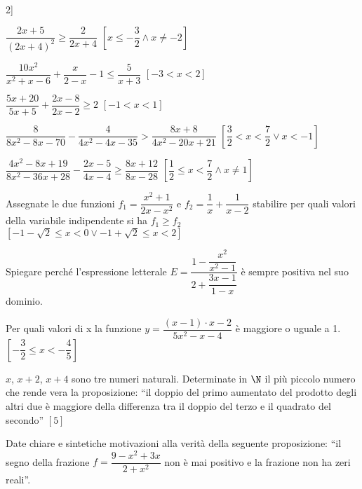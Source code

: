 \begin{esercizio}[\Ast]
\begin{enumeratea}
2\right]\)
\item \(\dfrac{2x+5}{(2x+4)^2}\ge \dfrac 2{2x+4}\) 
 \hfill \(\left[x\le -\dfrac 3 2 \wedge x \neq -2\right]\)
\item \(\dfrac{10x^2}{x^2+x-6}+\dfrac x{2-x}-1\le \dfrac 5{x+3}\) 
 \hfill \(\left[-3<x<2\right]\)
\item \(\dfrac{5x+20}{5x+5}+\dfrac{2x-8}{2x-2}\ge 2\) 
 \hfill \(\left[-1<x<1\right]\)
\item \(\dfrac 8{8x^2-8x-70}-\dfrac 4{4x^2-4x-35}>\dfrac{8x+8}{4x^2-20x+21}\)
 \hfill \(\left[\dfrac 3 2<x<\dfrac 7 2\vee x<-1\right]\)
\item \(\dfrac{4x^2-8x+19}{8x^2-36x+28}-\dfrac{2x-5}{4x-4}\ge 
\dfrac{8x+12}{8x-28}\)
 \hfill \(\left[\dfrac 1 2\le x<\dfrac 7 2 \wedge x \neq 1\right]\)
\end{enumeratea}
\end{esercizio}

\begin{esercizio}[\Ast]
 \label{ese:4.68}
Assegnate le due funzioni \(f_1=\dfrac{x^2+1}{2x-x^2}\) e \(f_2=\dfrac 1 
x+\dfrac 
1{x-2}\) stabilire per quali valori della variabile indipendente si ha 
\(f_1\ge 
f_2\)
 \hfill \(\left[-1-\sqrt 2\le x<0\vee -1+\sqrt 2\le x<2\right]\)
\end{esercizio}

\begin{esercizio}
 \label{ese:4.69}
Spiegare perché l'espressione letterale 
\(E=\dfrac{1-\dfrac{x^2}{x^2-1}}{2+\dfrac{3x-1}{1-x}}\) è sempre positiva nel 
suo 
dominio.
\end{esercizio}

\begin{esercizio}[\Ast]
 \label{ese:4.70}
Per quali valori di x la funzione \(y=\dfrac{(x-1)\cdot x-2}{5x^2-x-4}\) è 
maggiore 
o uguale a 1.
 \hfill \(\left[-\dfrac 3 2\le x<-\dfrac 4 5\right]\)
\end{esercizio}

\begin{esercizio}[\Ast]
 \label{ese:4.71}
\( x \), \( x+2 \), \( x+4 \) sono tre numeri naturali. Determinate in \( 
\N \) il 
più piccolo numero che rende vera la proposizione: ``il doppio del primo 
aumentato del prodotto degli altri due è maggiore della differenza tra il 
doppio 
del terzo e il quadrato del secondo''
 \hfill \(\left[5\right]\)
\end{esercizio}

\begin{esercizio}
 \label{ese:4.72}
Date chiare e sintetiche motivazioni alla verità della seguente proposizione: 
``il segno della frazione \(f=\dfrac{9-x^2+3x}{2+x^2}\) non è mai positivo e 
la 
frazione non ha zeri reali''.
\end{esercizio}


